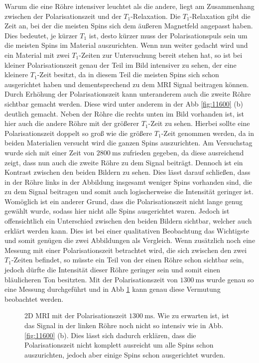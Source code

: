 Warum die eine Röhre intensiver leuchtet als die andere, liegt am Zusammenhang zwischen der Polarisationszeit und der $T_1$-Relaxation. Die $T_1$-Relaxation gibt die Zeit an, bei der die meisten Spins sich dem äußeren Magnetfeld angepasst haben. Dies bedeutet, je kürzer $T_1$ ist, desto kürzer muss der Polarisationspuls sein um die meisten Spins im Material auszurichten. Wenn nun weiter gedacht wird und ein Material mit zwei $T_1$-Zeiten zur Untersuchung bereit stehen hat, so ist bei kleiner Polarisationszeit genau der Teil im Bild intensiver zu sehen, der eine kleinere $T_1$-Zeit besitzt, da in diesem Teil die meisten Spins sich schon ausgerichtet haben und dementsprechend zu dem MRI Signal beitragen können.\\
Durch Erhöhung der Polarisationszeit kann unteranderem auch die zweite Röhre sichtbar gemacht werden. Diese wird unter anderem in der Abb \ref{fig:11600} (b)  deutlich gemacht. Neben der Röhre die rechts unten im Bild vorhanden ist, ist hier auch die andere Röhre mit der größerer $T_1$-Zeit zu sehen. Hierbei sollte eine Polarisationszeit doppelt so groß wie die größere $T_1$-Zeit genommen werden, da in beiden Materialien versucht wird die ganzen Spins auszurichten. Am Versuchstag wurde sich mit einer Zeit von $\SI{2800}{\milli\second}$ zufrieden gegeben, da diese ausreichend zeigt, dass nun auch die zweite Röhre zu dem Signal beiträgt. Dennoch ist ein Kontrast zwischen den beiden Bildern zu sehen. Dies lässt darauf schließen, dass in der Röhre links in der Abbildung insgesamt weniger Spins vorhanden sind, die zu dem Signal beitragen und somit auch logischerweise die Intensität geringer ist. Womöglich ist ein anderer Grund, dass die Polarisationszeit nicht lange genug gewählt wurde, sodass hier nicht alle Spins ausgerichtet waren. Jedoch ist offensichtlich ein Unterschied zwischen den beiden Bildern sichtbar, welcher auch erklärt werden kann. Dies ist bei einer qualitativen Beobachtung das Wichtigste und somit genügen die zwei Abbildungen als Vergleich. Wenn zusätzlich noch eine Messung mit einer Polarisationszeit betrachtet wird, die sich zwischen den zwei $T_1$-Zeiten befindet, so müsste ein Teil von der einen Röhre schon sichtbar sein, jedoch dürfte die Intensität dieser Röhre geringer sein und somit einen bläulicheren Ton besitzten. Mit der Polarisationszeit von $\SI{1300}{\milli\second}$ wurde genau so eine Messung durchgeführt und in Abb \ref{fig: 1300} kann genau diese Vermutung beobachtet werden.
    \begin{figure}[H]
        \centering
        
        \caption[2D MRI mit der Polarisationszeit $\SI{1300}{\milli\second}$]{2D MRI mit der Polarisationszeit $\SI{1300}{\milli\second}$. Wie zu erwarten ist, ist das Signal in der linken Röhre noch nicht so intensiv wie in Abb. \ref{fig:11600} (b). Dies lässt sich dadurch erklären, dass die Polarisationszeit nicht komplett ausreicht um alle Spins schon auszurichten, jedoch aber einige Spins schon ausgerichtet wurden.}
        \label{fig: 1300}
    \end{figure}
